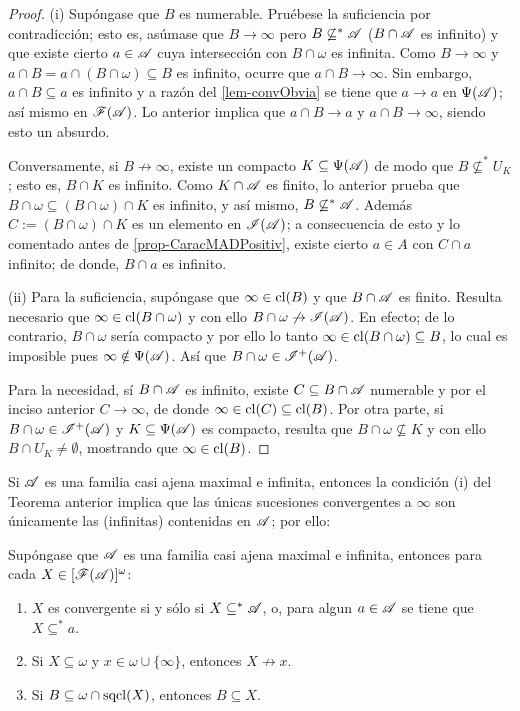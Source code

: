 \begin{proof}
	(i) Supóngase que $B$ es numerable. Pruébese la suficiencia por contradicción; esto es, asúmase que $B \to \infty$ pero $B \not\subseteq^* \mathscr{A}$ ($B\cap \mathscr{A}$ es infinito) y que existe cierto $a \in \mathscr{A}$ cuya intersección con $B \cap \omega$ es infinita. Como $B\to \infty$ y $a \cap B = a \cap (B \cap \omega) \subseteq B$ es infinito, ocurre que $a \cap B \to \infty$. Sin embargo, $a \cap B \subseteq a$ es infinito y a razón del \autoref{lem-convObvia} se tiene que $a \to a$ en $\Psi(\mathscr{A})$; así mismo en $\mathscr{F}(\mathscr{A})$. Lo anterior implica que $a \cap B \to a$ y $a \cap B \to \infty$, siendo esto un absurdo.

	Conversamente, si $B \not\to \infty$, existe un compacto $K \subseteq \Psi(\mathscr{A})$ de modo que $B \not\subseteq^* U_K$; esto es, $B \cap K$ es infinito. Como $K \cap \mathscr{A}$ es finito, lo anterior prueba que $B \cap \omega \subseteq (B \cap \omega) \cap K$ es infinito, y así mismo, $B \not\subseteq^* \mathscr{A}$. Además $C:=(B \cap \omega) \cap K$ es un elemento en $\mathscr{I}(\mathscr{A})$; a consecuencia de esto y lo comentado antes de \ref{prop-CaracMADPositiv}, existe cierto $a \in A$ con $C \cap a$ infinito; de donde, $B \cap a$ es infinito.

	(ii) Para la suficiencia, supóngase que $\infty \in \operatorname{cl}(B)$ y que $B \cap \mathscr{A}$ es finito. Resulta necesario que $\infty \in \operatorname{cl}(B \cap \omega)$ y con ello $B \cap \omega \not\to \mathscr{I}(\mathscr{A})$. En efecto; de lo contrario, $B \cap \omega$ sería compacto y por ello lo tanto $\infty \in \operatorname{cl}(B \cap \omega) \subseteq B$, lo cual es imposible pues $\infty \notin \Psi(\mathscr{A})$. Así que $B \cap \omega \in \mathscr{I}^+(\mathscr{A})$.

	Para la necesidad, sí $B \cap \mathscr{A}$ es infinito, existe $C \subseteq B \cap \mathscr{A}$ numerable y por el inciso anterior $C \to \infty$, de donde $\infty \in \operatorname{cl}(C) \subseteq \operatorname{cl}(B)$. Por otra parte, si $B \cap \omega \in \mathscr{I}^+(\mathscr{A})$ y $K \subseteq \Psi(\mathscr{A})$ es compacto, resulta que $B \cap \omega \not\subseteq K$ y con ello $B\cap U_K \neq \emptyset$, mostrando que $\infty \in \operatorname{cl}(B)$.
\end{proof}

Si $\mathscr{A}$ es una familia casi ajena maximal e infinita, entonces la condición (i) del Teorema anterior implica que las únicas sucesiones convergentes a $\infty$ son únicamente las (infinitas) contenidas en $\mathscr{A}$; por ello:
\begin{corolario}\label{cor-convMaximal}
	Supóngase que $\mathscr{A}$ es una familia casi ajena maximal e infinita, entonces para cada $X \in [\mathscr{F}(\mathscr{A})]^\omega$:
	\begin{enumerate}
		\item $X$ es convergente si y sólo si $X \subseteq^* \mathscr{A}$, o, para algun $a \in \mathscr{A}$ se tiene que $X \subseteq^* a$.
		\item Si $X \subseteq \omega$ y $x \in \omega \cup \{\infty\}$, entonces $X \not\to x$.
		\item Si $B \subseteq \omega \cap \operatorname{sqcl}(X)$, entonces $B \subseteq X$.
	\end{enumerate}
\end{corolario}

